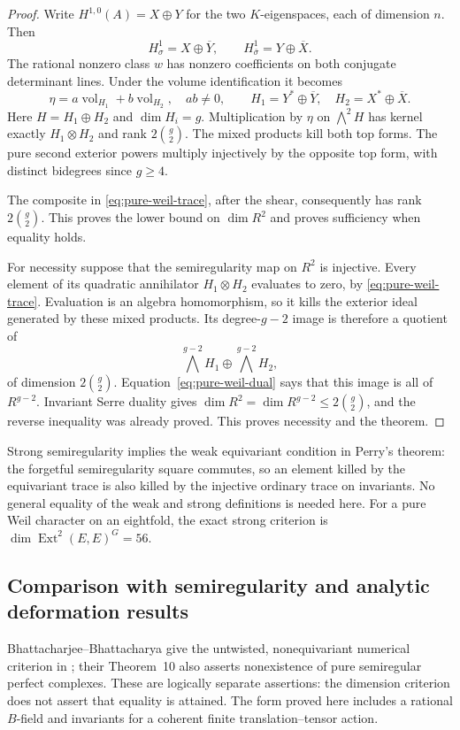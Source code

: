 \documentclass[11pt]{article}
\theoremstyle{definition}
\theoremstyle{remark}
\begin{document}
\begin{proof}
Write $H^{1,0}(A)=X\oplus Y$ for the two $K$-eigenspaces, each of dimension $n$. Then
\[
 H^1_\sigma=X\oplus\overline Y,
 \qquad H^1_{\bar\sigma}=Y\oplus\overline X.
\]
The rational nonzero class $w$ has nonzero coefficients on both conjugate determinant lines. Under the volume identification it becomes
\[
 \eta=a\operatorname{vol}_{H_1}+b\operatorname{vol}_{H_2},
 \quad ab\ne0,\qquad
 H_1=Y^*\oplus\overline Y,\quad H_2=X^*\oplus\overline X.
\]
Here $H=H_1\oplus H_2$ and $\dim H_i=g$. Multiplication by $\eta$ on $\bigwedge^2H$ has kernel exactly $H_1\otimes H_2$ and rank $2\binom g2$. The mixed products kill both top forms. The pure second exterior powers multiply injectively by the opposite top form, with distinct bidegrees since $g\ge4$.

The composite in \eqref{eq:pure-weil-trace}, after the shear, consequently has rank $2\binom g2$. This proves the lower bound on $\dim R^2$ and proves sufficiency when equality holds.

For necessity suppose that the semiregularity map on $R^2$ is injective. Every element of its quadratic annihilator $H_1\otimes H_2$ evaluates to zero, by \eqref{eq:pure-weil-trace}. Evaluation is an algebra homomorphism, so it kills the exterior ideal generated by these mixed products. Its degree-$g-2$ image is therefore a quotient of
\[
 \bigwedge^{g-2}H_1\oplus\bigwedge^{g-2}H_2,
\]
of dimension $2\binom g2$. Equation~\eqref{eq:pure-weil-dual} says that this image is all of $R^{g-2}$. Invariant Serre duality gives $\dim R^2=\dim R^{g-2}\le2\binom g2$, and the reverse inequality was already proved. This proves necessity and the theorem.
\end{proof}

Strong semiregularity implies the weak equivariant condition in Perry's theorem: the forgetful semiregularity square commutes, so an element killed by the equivariant trace is also killed by the injective ordinary trace on invariants. No general equality of the weak and strong definitions is needed here. For a pure Weil character on an eightfold, the exact strong criterion is $\dim\operatorname{Ext}^2(E,E)^G=56$.


\subsection{Comparison with semiregularity and analytic deformation results}

Bhattacharjee--Bhattacharya give the untwisted, nonequivariant numerical
criterion in \cite[Theorem~6]{BBSecantObjects}; their Theorem~10 also
asserts nonexistence of pure semiregular perfect complexes. These are
logically separate assertions: the dimension criterion does not assert
that equality is attained. The form proved here includes a rational
$B$-field and invariants for a coherent finite translation--tensor action.
\end{document}
